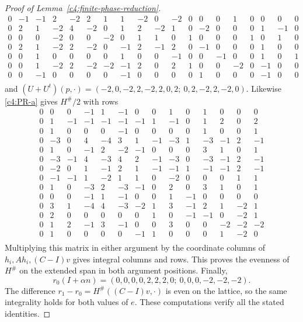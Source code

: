 \begin{proof}[Proof of Lemma~\ref{c4:finite-phase-reduction}]
\[\begin{array}{rrrrrrrrrrrrrrrrrrr}
0 & -1 & -1 & 2 & -2 & 2 & 1 & 1 & -2 & 0 & -2 & 0 & 0 & 0 & 1 & 0 & 0 & 0 & 0\\
0 & 2 & 1 & -2 & 4 & -2 & 0 & 1 & 2 & -2 & 1 & 0 & -2 & 0 & 0 & 0 & 1 & -1 & 0\\
0 & 0 & 0 & -2 & 0 & 0 & -2 & 0 & 1 & 1 & 0 & 1 & 0 & 0 & 0 & 1 & 0 & 1 & 0\\
0 & 2 & 1 & -2 & 2 & -2 & 0 & -1 & 2 & -1 & 2 & 0 & -1 & 0 & 0 & 0 & 1 & 0 & 0\\
0 & 0 & 1 & 0 & 0 & 0 & 0 & 1 & 0 & 0 & -1 & 0 & 0 & -1 & 0 & 0 & 1 & 0 & 1\\
0 & 0 & 1 & -2 & 2 & -2 & -2 & -1 & 2 & 0 & 2 & 1 & 0 & 0 & -2 & 0 & -1 & 0 & 0\\
0 & 0 & -1 & 0 & 0 & 0 & 0 & -1 & 0 & 0 & 0 & 0 & 1 & 0 & 0 & 0 & -1 & 0 & 0\\
\end{array}\]
\endgroup
and \((U+U^t)(p,\cdot)=(-2,0,-2,2,-2,2,0,2;\ 0,2,-2,2,-2,0)\). Likewise \eqref{c4:PR-a} gives \(H^\#/2\) with rows
\begingroup\setlength{\arraycolsep}{2pt}\scriptsize
\[\begin{array}{rrrrrrrrrrrrrr}
0 & 0 & 0 & -1 & 1 & -1 & 0 & 0 & 1 & 0 & 1 & 0 & 0 & 0\\
0 & 1 & -1 & -1 & -1 & -1 & -1 & 1 & -1 & 0 & 1 & 2 & 0 & 2\\
0 & 1 & 0 & 0 & 0 & -1 & 0 & 0 & 0 & 0 & 1 & 0 & 0 & 1\\
0 & -3 & 0 & 4 & -4 & 3 & 1 & -1 & -3 & 1 & -3 & -1 & 2 & -1\\
0 & 1 & 0 & -1 & 2 & -2 & -1 & 0 & 0 & 0 & 3 & 1 & 0 & 1\\
0 & -3 & -1 & 4 & -3 & 4 & 2 & -1 & -3 & 0 & -3 & -1 & 2 & -1\\
0 & -2 & 0 & 1 & -1 & 2 & 1 & -1 & -1 & 1 & -1 & -1 & 2 & -1\\
0 & -1 & -1 & 1 & -2 & 1 & 1 & 0 & -2 & 0 & 0 & 0 & 1 & 1\\
0 & 1 & 0 & -3 & 2 & -3 & -1 & 0 & 2 & 0 & 3 & 1 & 0 & 1\\
0 & 0 & 0 & -1 & 1 & -1 & 0 & 0 & 1 & -1 & 0 & 0 & 0 & 0\\
0 & 3 & 1 & -4 & 4 & -3 & -2 & 1 & 3 & -1 & 2 & 1 & -2 & 1\\
0 & 2 & 0 & 0 & 0 & 0 & 0 & 1 & 0 & -1 & -1 & 0 & -2 & 1\\
0 & 1 & 2 & -1 & 3 & -1 & 0 & 0 & 3 & 0 & 0 & -2 & -2 & -2\\
0 & 1 & 0 & 0 & 0 & 0 & -1 & 1 & 0 & 0 & 0 & 1 & -2 & 0\\
\end{array}\]
\endgroup
Multiplying this matrix in either argument by the coordinate columns of
\(h_i,Ah_i,(C-I)v\) gives integral columns and rows. This proves the
evenness of \(H^\#\) on the extended span in both argument positions.
Finally,
\[
 r_0(I+\alpha n)=(0,0,0,0,2,2,2,0;\ 0,0,0,-2,-2,-2).
\]
The difference \(r_1-r_0=H^\#((C-I)v,\cdot)\) is even on the lattice,
so the same integrality holds for both values of \(e\). These
computations verify all the stated identities.
\end{proof}
